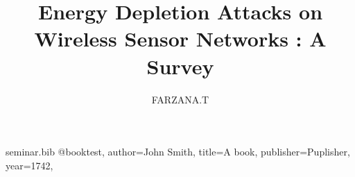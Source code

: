 \RequirePackage{filecontents}
\begin{filecontents*}{seminar.bib}
@book{test,
author={John Smith},
title={A book},
publisher={Puplisher},
year={1742},
}
\end{filecontents*}
\documentclass{beamer}
\usepackage{graphicx}

\usepackage{latexsym}		%
\usepackage{epsfig}		%
\usepackage{rotating}		%
\usepackage{eufrak}
\usepackage{natbib}
\def\newblock{\hskip .11em plus .33em minus .07em}





%
%


{
  \usetheme{Madrid}

  \setbeamercovered{transparent}
}


\usepackage[english]{babel}

\usepackage[latin1]{inputenc}

\usepackage{times}
\usepackage[T1]{fontenc}


\title[Energy Depletion Attacks on Wireless Sensor Networks : A Survey] %
{Energy Depletion Attacks on Wireless Sensor Networks : A Survey}
%

\author[FARZANA.T] %
{FARZANA.T}

